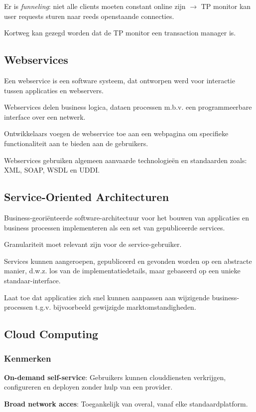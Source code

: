 \documentclass[a4paper,12pt]{article}
\begin{document}
Er is \textit{funneling}: niet alle clients moeten constant online zijn
$\rightarrow$ TP monitor kan user requests sturen naar reeds openstaande connecties.

Kortweg kan gezegd worden dat de TP monitor een transaction manager is.

\subsection{Webservices}
Een webservice is een software systeem, dat ontworpen werd voor interactie tussen applicaties en webservers.

Webservices delen business logica, dataen processen m.b.v. een programmeerbare interface over een netwerk.

Ontwikkelaars voegen de webservice toe aan een webpagina om specifieke functionaliteit aan te bieden aan de gebruikers.

Webservices gebruiken algemeen aanvaarde technologieën en standaarden zoals: XML, SOAP, WSDL en UDDI.

\subsection{Service-Oriented Architecturen}
Business-georiënteerde software-architectuur voor het bouwen van applicaties en business processen implementeren als een set van gepubliceerde services.

Granulariteit moet relevant zijn voor de service-gebruiker.

Services kunnen aangeroepen, gepubliceerd en gevonden worden op een abstracte manier, d.w.z. los van de implementatiedetails, maar gebaseerd op een unieke standaar-interface.

Laat toe dat applicaties zich snel kunnen aanpassen aan wijzigende business-processen t.g.v. bijvoorbeeld gewijzigde marktomstandigheden.

\subsection{Cloud Computing}
\subsubsection{Kenmerken}
\textbf{On-demand self-service}: Gebruikers kunnen clouddiensten verkrijgen, configureren en deployen zonder hulp van een provider.

\textbf{Broad network acces}: Toegankelijk van overal, vanaf elke standaardplatform.
\end{document}
